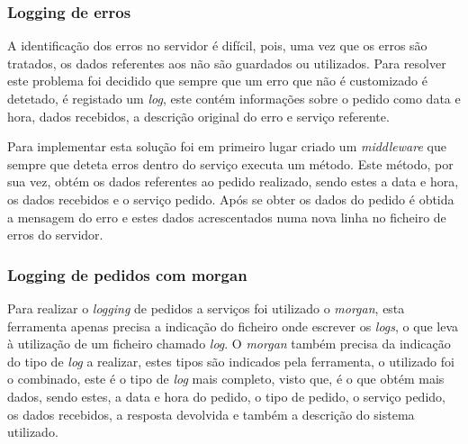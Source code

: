 \subsubsection{Logging de erros}

A identificação dos erros no servidor é difícil, pois, uma vez que os erros são tratados, os dados referentes aos não são guardados ou utilizados. Para resolver este problema foi decidido que sempre que um erro que não é customizado é detetado, é registado um \textit{log}, este contém informações sobre o pedido como data e hora, dados recebidos, a descrição original do erro e serviço referente.

Para implementar esta solução foi em primeiro lugar criado um \textit{middleware} que sempre que deteta erros dentro do serviço executa um método. Este método, por sua vez, obtém os dados referentes ao pedido realizado, sendo estes a data e hora, os dados recebidos e o serviço pedido. Após se obter os dados do pedido é obtida a mensagem do erro e estes dados acrescentados numa nova linha no ficheiro de erros do servidor.

\subsubsection{Logging de pedidos com morgan}

Para realizar o \textit{logging} de pedidos a serviços foi utilizado o \textit{morgan}, esta ferramenta apenas precisa a indicação do ficheiro onde escrever os \textit{logs}, o que leva à utilização de um ficheiro chamado \textit{log}. O \textit{morgan} também precisa da indicação do tipo de \textit{log} a realizar, estes tipos são indicados pela ferramenta, o utilizado foi o combinado, este é o tipo de \textit{log} mais completo, visto que, é o que obtém mais dados, sendo estes, a data e hora do pedido, o tipo de pedido, o serviço pedido, os dados recebidos, a resposta devolvida e também a descrição do sistema utilizado.